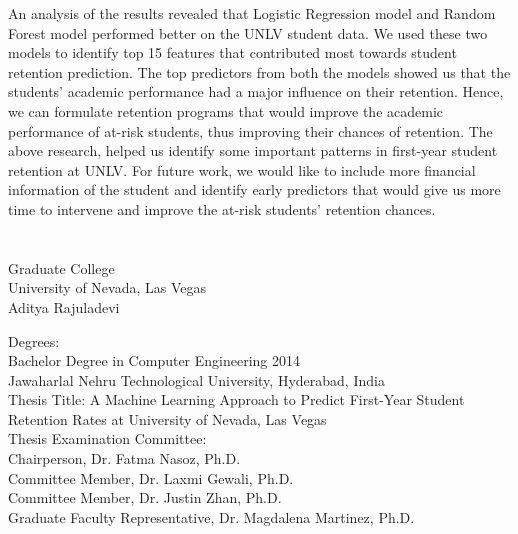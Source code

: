 \documentclass[11pt,openright]{report}
\begin{document}
An analysis of the results revealed that Logistic Regression model and Random Forest model performed better on the UNLV student data. We used these two models to identify top 15 features that contributed most towards student retention prediction. The top predictors from both the models showed us that the students' academic performance had a major influence on their retention. Hence, we can formulate retention programs that would improve the academic performance of at-risk students, thus improving their chances of retention. The above research, helped us identify some important patterns in first-year student retention at UNLV. For future work, we would like to include more financial information of the student and identify early predictors that would give us more time to intervene and improve the at-risk students' retention chances.





\vita
\chapter{} %
\linespread{1.3} 
\begin{center}
Graduate College\\
University of Nevada, Las Vegas\\[1cm]
Aditya Rajuladevi\\[1cm]
\end{center}

\noindent Degrees:\\
\indent Bachelor Degree in Computer Engineering 2014\\
\indent Jawaharlal Nehru Technological University, Hyderabad, India\\

\noindent Thesis Title: A Machine Learning Approach to Predict First-Year Student Retention Rates at University of Nevada, Las Vegas\\

\noindent Thesis Examination Committee:\\
\indent Chairperson, Dr. Fatma Nasoz, Ph.D.\\
\indent Committee Member, Dr. Laxmi Gewali, Ph.D.\\
\indent Committee Member, Dr. Justin Zhan, Ph.D.\\
\indent Graduate Faculty Representative, Dr. Magdalena Martinez, Ph.D.\\
\end{document}
